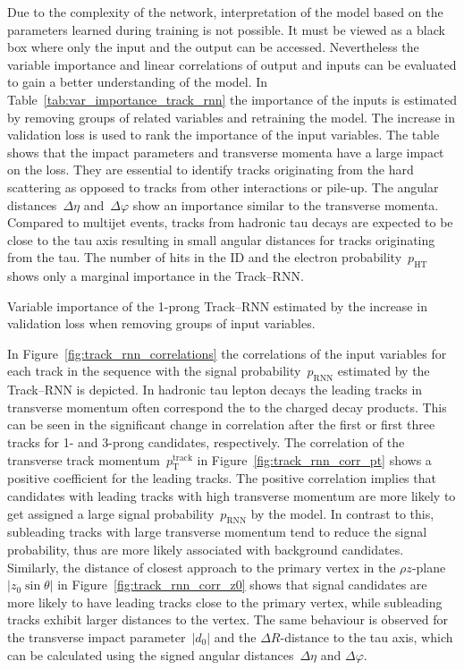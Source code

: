 Due to the complexity of the network, interpretation of the model based on the
parameters learned during training is not possible. It must be viewed as a black
box where only the input and the output can be accessed. Nevertheless the
variable importance and linear correlations of output and inputs can be
evaluated to gain a better understanding of the model. In
Table~\ref{tab:var_importance_track_rnn} the importance of the inputs is
estimated by removing groups of related variables and retraining the model. The
increase in validation loss is used to rank the importance of the input
variables. The table shows that the impact parameters and transverse momenta
have a large impact on the loss. They are essential to identify tracks
originating from the hard scattering as opposed to tracks from other
interactions or pile-up. The angular distances~$\Delta \eta$
and~$\Delta \varphi$ show an importance similar to the transverse momenta.
Compared to multijet events, tracks from hadronic tau decays are expected to be
close to the tau axis resulting in small angular distances for tracks
originating from the tau. The number of hits in the ID and the electron
probability~$p_\text{HT}$ shows only a marginal importance in the Track--RNN.

\begin{table}[htb]
  \centering
  {\small}
  \caption{Variable importance of the 1-prong Track--RNN estimated by the
    increase in validation loss when removing groups of input variables.}
  \label{tab:var_importance_track_rnn}
\end{table}

In Figure~\ref{fig:track_rnn_correlations} the correlations of the input
variables for each track in the sequence with the signal
probability~$p_\text{RNN}$ estimated by the Track--RNN is depicted. In hadronic
tau lepton decays the leading tracks in transverse momentum often correspond the
to the charged decay products. This can be seen in the significant change in
correlation after the first or first three tracks for 1- and 3-prong candidates,
respectively. The correlation of the transverse track
momentum~$p_\text{T}^\text{track}$ in Figure~\ref{fig:track_rnn_corr_pt} shows a
positive coefficient for the leading tracks. The positive correlation implies
that candidates with leading tracks with high transverse momentum are more
likely to get assigned a large signal probability~$p_\text{RNN}$ by the model.
In contrast to this, subleading tracks with large transverse momentum tend to
reduce the signal probability, thus are more likely associated with background
\tauhadvis candidates. Similarly, the distance of closest approach to the
primary vertex in the $\rho z$-plane~$|z_0 \sin\theta|$ in
Figure~\ref{fig:track_rnn_corr_z0} shows that signal candidates are more likely
to have leading tracks close to the primary vertex, while subleading tracks
exhibit larger distances to the vertex. The same behaviour is observed for the
transverse impact parameter~$|d_0|$ and the $\Delta R$-distance to the tau axis,
which can be calculated using the signed angular distances~$\Delta \eta$ and
$\Delta \varphi$.

